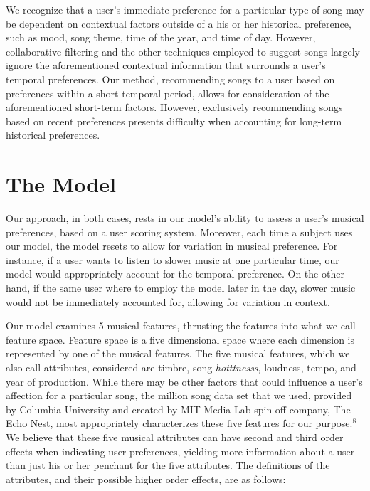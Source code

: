 \documentclass{amsart}
\theoremstyle{plain}
\theoremstyle{definition}
\begin{document}
  	We recognize that a user's immediate preference for a particular type of song may be dependent on contextual factors outside of a his or her historical preference, such as mood, song theme, time of the year, and time of day. However, collaborative filtering and the other techniques employed to suggest songs largely ignore the aforementioned contextual information that surrounds a user's temporal preferences. Our method, recommending songs to a user based on preferences within a short temporal period, allows for consideration of the aforementioned short-term factors. However, exclusively recommending songs based on recent preferences presents difficulty when accounting for long-term historical preferences.
   	
   	\section{The Model}
   	
   	Our approach, in both cases, rests in our model's ability to assess a user's musical preferences, based on a user scoring system. Moreover, each time a subject uses our model, the model resets to allow for variation in musical preference. For instance, if a user wants to listen to slower music at one particular time, our model would appropriately account for the temporal preference. On the other hand, if the same user where to employ the model later in the day, slower music would not be immediately accounted for, allowing for variation in context. 
   	
   	Our model examines 5 musical features, thrusting the features into what we call feature space. Feature space is a five dimensional space where each dimension is represented by one of the musical features. The five musical features, which we also call attributes, considered are timbre, song \textit{hotttnesss}, loudness, tempo, and year of production. While there may be other factors that could influence a user's affection for a particular song, the million song data set that we used, provided by Columbia University and created by MIT Media Lab spin-off company, The Echo Nest, most appropriately characterizes these five features for our purpose.$^{8}$ We believe that these five musical attributes can have second and third order effects when indicating user preferences, yielding more information about a user than just his or her penchant for the five attributes. The definitions of the attributes, and their possible higher order effects, are as follows: \\
   	
\end{document}
